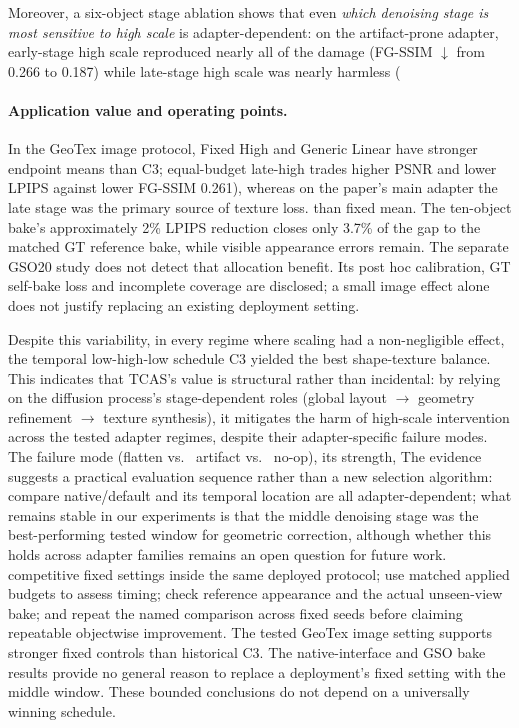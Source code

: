 \documentclass[times,twocolumn,final]{elsarticle}
\providecommand{\DIFadd}[1]{{\protect\color{blue} \sf #1}} %
\providecommand{\DIFdel}[1]{{\protect\color{red} \scriptsize #1}} %
\providecommand{\DIFaddbegin}{} %
\providecommand{\DIFaddend}{} %
\providecommand{\DIFdelbegin}{} %
\providecommand{\DIFdelend}{} %
\begin{document}
\DIFdelbegin \DIFdel{Moreover, a six-object stage ablation shows that even \emph{which denoising stage is most sensitive to high scale} is adapter-dependent: on the artifact-prone adapter, early-stage high scale reproduced nearly all of the damage (FG-SSIM $\downarrow$ from 0.266 to 0.187) while late-stage high scale was nearly harmless (}\DIFdelend \DIFaddbegin \paragraph{Application value and operating points.}
\DIFadd{In the GeoTex image protocol, Fixed High and Generic Linear have stronger endpoint means than C3; equal-budget late-high trades higher PSNR and lower LPIPS against lower }\DIFaddend FG-SSIM \DIFdelbegin \DIFdel{0.261), whereas on the paper's main adapter the late stage was the primary source of texture loss.
}\DIFdelend \DIFaddbegin \DIFadd{than fixed mean. The ten-object bake's approximately 2\% LPIPS reduction closes only 3.7\% of the gap to the matched GT reference bake, while visible appearance errors remain. The separate GSO20 study does not detect that allocation benefit. Its post hoc calibration, GT self-bake loss and incomplete coverage are disclosed; a small image effect alone does not justify replacing an existing deployment setting.
}\DIFaddend 

\DIFdelbegin \DIFdel{Despite this variability, in every regime where scaling had a non-negligible effect, the temporal low-high-low schedule C3 yielded the best shape-texture balance. This indicates that TCAS's value is structural rather than incidental: by relying on the diffusion process's stage-dependent roles (global layout $\to$ geometry refinement $\to$ texture synthesis), it mitigates the harm of high-scale intervention across the tested adapter regimes, despite their adapter-specific failure modes. The failure mode (flatten vs. \ artifact vs. \ no-op), its strength, }\DIFdelend \DIFaddbegin \DIFadd{The evidence suggests a practical evaluation sequence rather than a new selection algorithm: compare native/default }\DIFaddend and \DIFdelbegin \DIFdel{its temporal location are all adapter-dependent; what remains stable in our experiments is that the middle denoising stage was the best-performing tested window for geometric correction, although whether this holds across adapter families remains an open question for future work.
}\DIFdelend \DIFaddbegin \DIFadd{competitive fixed settings inside the same deployed protocol; use matched applied budgets to assess timing; check reference appearance and the actual unseen-view bake; and repeat the named comparison across fixed seeds before claiming repeatable objectwise improvement. The tested GeoTex image setting supports stronger fixed controls than historical C3. The native-interface and GSO bake results provide no general reason to replace a deployment's fixed setting with the middle window. These bounded conclusions do not depend on a universally winning schedule.
}\DIFaddend 
\end{document}

